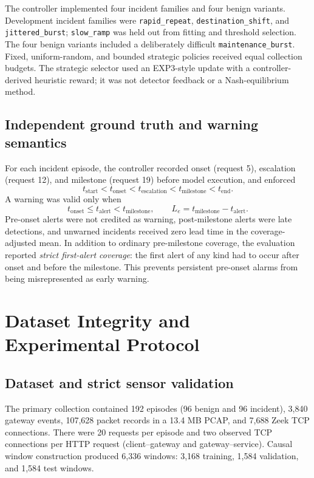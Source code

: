 \documentclass[10pt,a4paper]{article}
\begin{document}
The controller implemented four incident families and four benign variants. Development incident families were \texttt{rapid\_repeat}, \texttt{destination\_shift}, and \texttt{jittered\_burst}; \texttt{slow\_ramp} was held out from fitting and threshold selection. The four benign variants included a deliberately difficult \texttt{maintenance\_burst}. Fixed, uniform-random, and bounded strategic policies received equal collection budgets. The strategic selector used an EXP3-style update with a controller-derived heuristic reward; it was not detector feedback or a Nash-equilibrium method.

\subsection{Independent ground truth and warning semantics}

For each incident episode, the controller recorded onset (request 5), escalation (request 12), and milestone (request 19) before model execution, and enforced
\[
t_{\mathrm{start}} < t_{\mathrm{onset}} < t_{\mathrm{escalation}} < t_{\mathrm{milestone}} < t_{\mathrm{end}}.
\]
A warning was valid only when
\[
t_{\mathrm{onset}} \leq t_{\mathrm{alert}} < t_{\mathrm{milestone}},
\qquad
L_e=t_{\mathrm{milestone}}-t_{\mathrm{alert}}.
\]
Pre-onset alerts were not credited as warning, post-milestone alerts were late detections, and unwarned incidents received zero lead time in the coverage-adjusted mean. In addition to ordinary pre-milestone coverage, the evaluation reported \emph{strict first-alert coverage}: the first alert of any kind had to occur after onset and before the milestone. This prevents persistent pre-onset alarms from being misrepresented as early warning.

\section{Dataset Integrity and Experimental Protocol}

\subsection{Dataset and strict sensor validation}

The primary collection contained 192 episodes (96 benign and 96 incident), 3,840 gateway events, 107,628 packet records in a 13.4 MB PCAP, and 7,688 Zeek TCP connections. There were 20 requests per episode and two observed TCP connections per HTTP request (client--gateway and gateway--service). Causal window construction produced 6,336 windows: 3,168 training, 1,584 validation, and 1,584 test windows.
\end{document}
